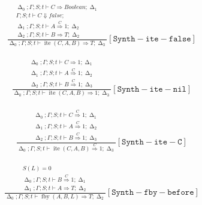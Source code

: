 \documentclass{scrartcl}
\DeclareMathOperator{\fby}{fby}
\DeclareMathOperator{\ite}{ite}
\DeclareMathOperator{\gtypes}{\Delta}
\begin{document}
    \begin{align*}
    \frac{
        \begin{matrix}
        \gtypes_0; \Gamma; S; t \vdash C \Rightarrow Boolean; \gtypes_1 \\
        \Gamma; S; t \vdash C \Downarrow false;  \\
        \gtypes_1; \Gamma; S; t \vdash A \overset{C}{\Rightarrow} 1; \gtypes_2 \\
        \gtypes_2; \Gamma; S; t \vdash B \Rightarrow T; \gtypes_2
        \end{matrix}
    }{
        \gtypes_0; \Gamma; S; t \vdash \ite(C,A,B) \Rightarrow T; \gtypes_3
    }[\mathtt{Synth-ite-false}]
    \end{align*}
    
    \begin{align*}
    \frac{
        \begin{matrix}
        \gtypes_0; \Gamma; S; t \vdash C \Rightarrow 1; \gtypes_1 \\
        \gtypes_1; \Gamma; S; t \vdash A \overset{C}{\Rightarrow} 1; \gtypes_2 \\
        \gtypes_2; \Gamma; S; t \vdash B \overset{C}{\Rightarrow} 1; \gtypes_3
        \end{matrix}
    }{
        \gtypes_0; \Gamma; S; t \vdash \ite(C,A,B) \Rightarrow 1; \gtypes_3
    }[\mathtt{Synth-ite-nil}]
    \end{align*}
    
    \begin{align*}
    \frac{
        \begin{matrix}
        \gtypes_0; \Gamma; S; t \vdash C \overset{C}{\Rightarrow} 1; \gtypes_1 \\
        \gtypes_1; \Gamma; S; t \vdash A \overset{C}{\Rightarrow} 1; \gtypes_2 \\
        \gtypes_2; \Gamma; S; t \vdash B \overset{C}{\Rightarrow} 1; \gtypes_3
        \end{matrix}
    }{
        \gtypes_0; \Gamma; S; t \vdash \ite(C,A,B) \overset{C}{\Rightarrow} 1; \gtypes_3
    }[\mathtt{Synth-ite-C}]
    \end{align*}
    
    \begin{align*}
    \frac{
        \begin{matrix}
        S(L) = 0 \\
        \gtypes_0; \Gamma; S; t \vdash B \overset{C}{\Rightarrow} 1; \gtypes_1 \\
        \gtypes_1; \Gamma; S; t \vdash A \Rightarrow T; \gtypes_2
        \end{matrix}
    }{
        \gtypes_0; \Gamma; S; t \vdash \fby(A, B, L) \Rightarrow T; \gtypes_2
    }[\mathtt{Synth-fby-before}]
    \end{align*}
    
\end{document}
